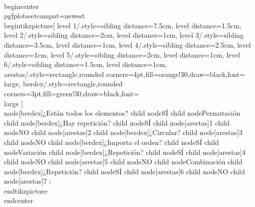 \\begin{center}
  \\pgfplotsset{compat=newest}
	\\begin{tikzpicture}[		level 1/.style={sibling distance=7.5cm, level distance=1.5cm},		level 2/.style={sibling distance=2cm, level distance=1cm},		level 3/.style={sibling distance=3.5cm, level distance=1cm},		level 4/.style={sibling distance=2.5cm, level distance=1cm},		level 5/.style={sibling distance=2cm, level distance=1cm},		level 6/.style={sibling distance=1.5cm, level distance=1cm},		arestas/.style={rectangle,rounded corners=4pt,fill=orange!30,draw=black,font=\\large},		berdex/.style={rectangle,rounded corners=3pt,fill=green!30,draw=black,font=\\large}	]
	\\node[berdex]{¿Están todos los elementos?}
	child{
		node{SÍ}
	    child{
	    	node{Permutación}
	        child{
	        	node[berdex]{¿Hay repetición?}
	            child{
	            	node{SÍ}
	                child{
				        node[arestas]{1}
				    }
	            }
	            child{
	            	node{NO}
	                child{
				        node[arestas]{2}
	                }
				        child{
				        node[berdex]{¿Circular?}
				            child{
				            node[arestas]{3}
				            }
	                }   
	            }
	        }
	    }
	}
	child{
		node{NO}
	    child{
	    	node[berdex]{¿Importa el orden?}
	        child{
	        	node{SÍ}
	            child{
	            	node{Variación}
	                child{
	                	node[berdex]{¿Repetición?}
	                    child{
	                    	node{SÍ}
	                        child{
						        node[arestas]{4}
						    }
	                    }
	                    child{
	                    	node{NO}
	                        child{
						        node[arestas]{5}
						    }
	                    }
	                }
	            }
	        }
	        child{
	        	node{NO}
	            child{
	            	node{Combinación}
	                child{
	                	node[berdex]{¿Repetición?}
	                    child{
	                    	node{SÍ}
	                        child{
						        node[arestas]{6}
						    }
	                    }
	                    child{
	                    	node{NO}
	                        child{
						        node[arestas]{7}
						    }
	                    }
	                }
	            }
	        }
	    }    
	};
	\\end{tikzpicture}   
\\end{center}

